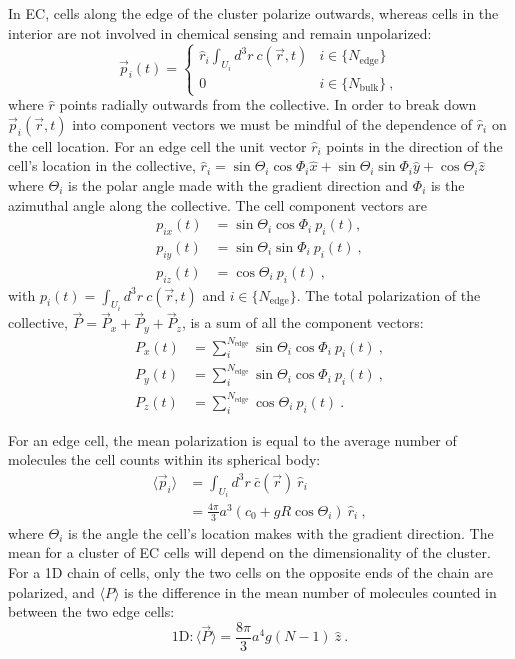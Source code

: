In EC, cells along the edge of the cluster polarize outwards, whereas cells in the interior are not involved in chemical sensing and remain unpolarized:
\begin{equation}
    \vec{p}_i(t) =
    \begin{cases}
         \hat{r}_i \int_{U_i} d^3r \ c(\vec{r},t) &i \in \{ N_\text{edge} \} \\
        0 &i \in \{ N_\text{bulk} \} \ ,
    \end{cases}
\end{equation}
where $\hat{r}$ points radially outwards from the collective. In order to break down $\vec{p}_i(\vec{r},t)$ into component vectors we must be mindful of the dependence of $\hat{r}_i$ on the cell location. For an edge cell the unit vector $\hat{r}_i$ points in the direction of the cell's location in the collective,
$\hat{r}_i = \sin\Theta_i\cos\Phi_i \hat{x} + \sin\Theta_i\sin\Phi_i \hat{y} + \cos\Theta_i \hat{z}$
where $\Theta_i$ is the polar angle made with the gradient direction and $\Phi_i$ is the azimuthal angle along the collective. The cell component vectors are
\begin{align}
    p_{ix}(t) &= \sin\Theta_i\cos\Phi_i \ p_i(t) , \\
    p_{iy}(t) &= \sin\Theta_i\sin\Phi_i \ p_i(t) \ , \\
    p_{iz}(t) &= \cos\Theta_i \ p_i(t) \ ,
\end{align}
with $p_i(t) = \int_{U_i} d^3r \ c(\vec{r},t)$ and $i \in \{ N_\text{edge}\}$. The total polarization of the collective,
$\vec{P} = \vec{P}_x + \vec{P}_y + \vec{P}_z$,
is a sum of all the component vectors:
\begin{align}
    P_x(t) &= \sum_i^{N_\text{edge}} \sin\Theta_i\cos\Phi_i \ p_i(t) \ , \label{eq:PECx} \\
    P_y(t) &= \sum_i^{N_\text{edge}} \sin\Theta_i\cos\Phi_i \ p_i(t) \ , \label{eq:PECy} \\
    P_z(t) &= \sum_i^{N_\text{edge}} \cos\Theta_i \ p_i(t) \ . \label{eq:PECz}
\end{align}

For an edge cell, the mean polarization is equal to the average number of molecules the cell counts within its spherical body:
\begin{align*}
    \langle \vec{p}_i \rangle &= \int_{U_i} d^3r \ \bar{c}(\vec{r}) \ \hat{r}_i \\
    &= \frac{4\pi}{3}a^3 (c_0+gR\cos\Theta_i) \ \hat{r}_i \ ,
\end{align*}
where $\Theta_i$ is the angle the cell's location makes with the gradient direction. The mean for a cluster of EC cells will depend on the dimensionality of the cluster. For a 1D chain of cells, only the two cells on the opposite ends of the chain are polarized, and $\langle P \rangle$ is the difference in the mean number of molecules counted in between the two edge cells:
\begin{equation} \label{eq:1DECmean}
    \text{1D}: \langle \vec{P} \rangle = \frac{8\pi}{3}a^4g (N-1) \ \hat{z} \ .
\end{equation}

